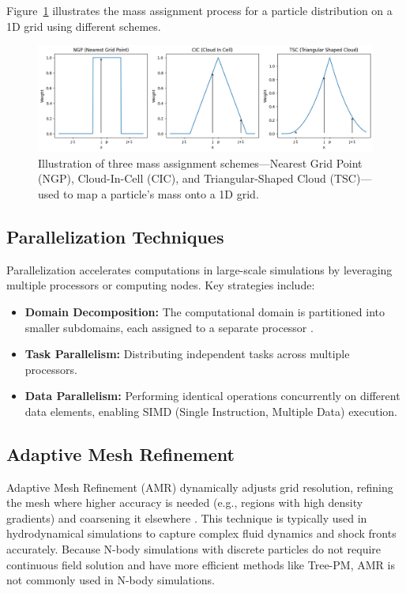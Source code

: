 Figure~\ref{fig:mass-assignment} illustrates the mass assignment process for a particle distribution on a 1D grid using different schemes.
\begin{figure}[ht]
    \centering
    \includegraphics[width=\textwidth]{figures/weight_functions.png}
    \caption[Illustration of three mass assignment schemes]{Illustration of three mass assignment schemes—Nearest Grid Point (NGP), Cloud-In-Cell (CIC), and Triangular-Shaped Cloud (TSC)—used to map a particle's mass onto a 1D grid.}
    \label{fig:mass-assignment}
\end{figure}

\subsection{Parallelization Techniques}
Parallelization accelerates computations in large-scale simulations by leveraging multiple processors or computing nodes. Key strategies include:
\begin{itemize}
    \item \textbf{Domain Decomposition:} The computational domain is partitioned into smaller subdomains, each assigned to a separate processor \citep{1986Natur.324..446B}.
    \item \textbf{Task Parallelism:} Distributing independent tasks across multiple processors.
    \item \textbf{Data Parallelism:} Performing identical operations concurrently on different data elements, enabling SIMD (Single Instruction, Multiple Data) execution.
\end{itemize}

\subsection{Adaptive Mesh Refinement}
Adaptive Mesh Refinement (AMR) dynamically adjusts grid resolution, refining the mesh where higher accuracy is needed (e.g., regions with high density gradients) and coarsening it elsewhere \citep{1989JCoPh..82...64B}. This technique is typically used in hydrodynamical simulations to capture complex fluid dynamics and shock fronts accurately.
Because N-body simulations with discrete particles do not require continuous field solution and have more efficient methods like Tree-PM, AMR is not commonly used in N-body simulations.

